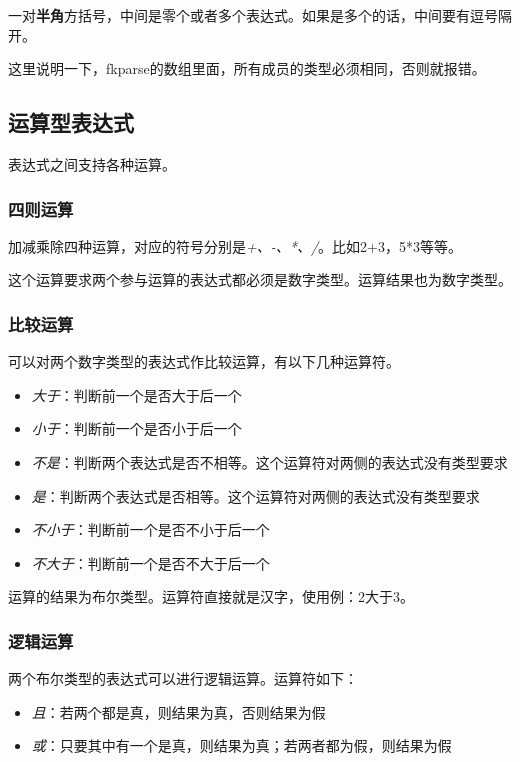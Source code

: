 一对\textbf{半角}方括号，中间是零个或者多个表达式。如果是多个的话，中间要有逗号隔开。

这里说明一下，fkparse的数组里面，所有成员的类型必须相同，否则就报错。

\subsection{运算型表达式}

表达式之间支持各种运算。

\subsubsection{四则运算}

加减乘除四种运算，对应的符号分别是\emph{+、-、*、/}。比如2+3，5*3等等。

这个运算要求两个参与运算的表达式都必须是数字类型。运算结果也为数字类型。

\subsubsection{比较运算}

可以对两个数字类型的表达式作比较运算，有以下几种运算符。

\begin{itemize}
 \item \emph{大于}：判断前一个是否大于后一个
 \item \emph{小于}：判断前一个是否小于后一个
 \item \emph{不是}：判断两个表达式是否不相等。这个运算符对两侧的表达式没有类型要求
 \item \emph{是}：判断两个表达式是否相等。这个运算符对两侧的表达式没有类型要求
 \item \emph{不小于}：判断前一个是否不小于后一个
 \item \emph{不大于}：判断前一个是否不大于后一个
\end{itemize}

运算的结果为布尔类型。运算符直接就是汉字，使用例：2大于3。

\subsubsection{逻辑运算}

两个布尔类型的表达式可以进行逻辑运算。运算符如下：

\begin{itemize}
 \item \emph{且}：若两个都是真，则结果为真，否则结果为假
 \item \emph{或}：只要其中有一个是真，则结果为真；若两者都为假，则结果为假
\end{itemize}


